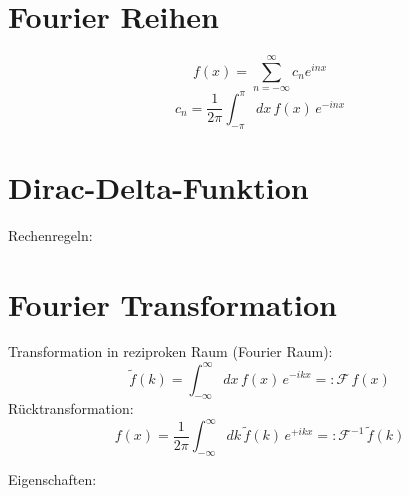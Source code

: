 \section{Fourier Reihen}

\begin{framedprop}
	\[
	f(x) = \sum_{n=-\infty}^{\infty} c_n e^{inx}
	\]
	\[
	c_n = \frac{1}{2\pi} \int_{-\pi}^{\pi}dx \, f(x) \, e^{-inx}
	\]
\end{framedprop}

\section{Dirac-Delta-Funktion}

\begin{frameddefn}
	
\end{frameddefn}

\begin{frameddefn}
	
\end{frameddefn}

\begin{frameddefn}
	
\end{frameddefn}

Rechenregeln:

\section{Fourier Transformation}

\begin{framedprop}
	Transformation in reziproken Raum (Fourier Raum):
	\[
	\tilde{f}(k) = \int_{-\infty}^{\infty} dx\, f(x)\, e^{-ikx} =: \mathcal{F}\, f(x)
	\]
	Rücktransformation:
	\[
	f(x) = \frac{1}{2\pi} \int_{-\infty}^{\infty} dk\, \tilde{f}(k)\, e^{+ikx} =: \mathcal{F}^{-1}\, \tilde{f}(k)
 	\]
\end{framedprop}

Eigenschaften:

\begin{framedprop}
	
\end{framedprop}